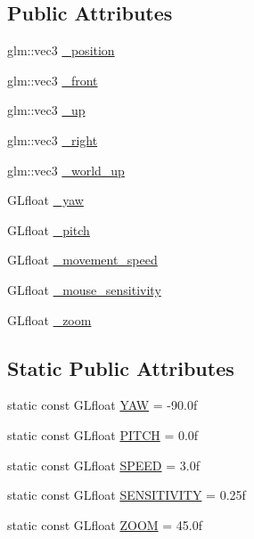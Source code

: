 \subsection*{Public Attributes}
\begin{DoxyCompactItemize}
\item 
glm\-::vec3 \hyperlink{classCamera_a0a931ed2051befaad1f482b3b5e98ca0}{\-\_\-position}
\item 
glm\-::vec3 \hyperlink{classCamera_ac610e748840c4b70c9081c2d68df2e8d}{\-\_\-front}
\item 
glm\-::vec3 \hyperlink{classCamera_a323a698e4c5773ee3ec380851b145e2d}{\-\_\-up}
\item 
glm\-::vec3 \hyperlink{classCamera_a4c556280ed181d8589c28eec7ebebb49}{\-\_\-right}
\item 
glm\-::vec3 \hyperlink{classCamera_aa5d721a01ba1cb41eafb02e39ea29e03}{\-\_\-world\-\_\-up}
\item 
G\-Lfloat \hyperlink{classCamera_ab815461cc043db1f5810c2f488641740}{\-\_\-yaw}
\item 
G\-Lfloat \hyperlink{classCamera_a23a8b8859c44721d7082b89809318918}{\-\_\-pitch}
\item 
G\-Lfloat \hyperlink{classCamera_a6f31b5658310866d3228614a755b59b0}{\-\_\-movement\-\_\-speed}
\item 
G\-Lfloat \hyperlink{classCamera_aeb483d642e0bcf11aa881467ac9676fe}{\-\_\-mouse\-\_\-sensitivity}
\item 
G\-Lfloat \hyperlink{classCamera_a99dc4d95f58be2427ff6c8d93c676ecd}{\-\_\-zoom}
\end{DoxyCompactItemize}
\subsection*{Static Public Attributes}
\begin{DoxyCompactItemize}
\item 
static const G\-Lfloat \hyperlink{classCamera_a79050e94e98c5c1cc0127c41edb4ed16}{Y\-A\-W} = -\/90.\-0f
\item 
static const G\-Lfloat \hyperlink{classCamera_afd43f32a47d2db8922dc32030fd84379}{P\-I\-T\-C\-H} = 0.\-0f
\item 
static const G\-Lfloat \hyperlink{classCamera_acc2ddbb4a3bdb2829896703edf72ca1e}{S\-P\-E\-E\-D} = 3.\-0f
\item 
static const G\-Lfloat \hyperlink{classCamera_adee09ae2133f9fe95a6eb72a6cb8db20}{S\-E\-N\-S\-I\-T\-I\-V\-I\-T\-Y} = 0.\-25f
\item 
static const G\-Lfloat \hyperlink{classCamera_a34cdfe4c17868880037d5ff78159f158}{Z\-O\-O\-M} = 45.\-0f
\end{DoxyCompactItemize}
